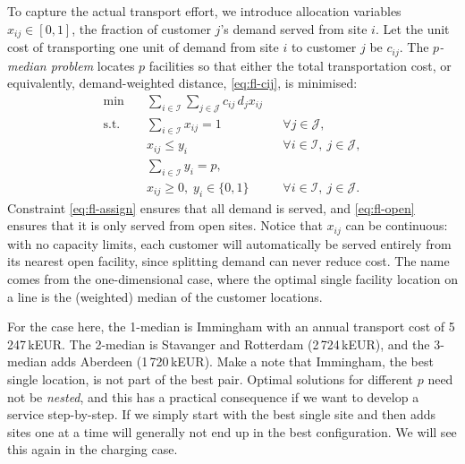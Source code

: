 To capture the actual transport effort, we introduce allocation variables $x_{ij}\in[0,1]$, the fraction of customer $j$'s demand served from site $i$. Let the unit cost of transporting one unit of demand from site $i$ to customer $j$ be $c_{ij}$. The \emph{$p$-median problem} locates $p$ facilities so that either the total transportation cost, or equivalently, demand-weighted distance, \eqref{eq:fl-cij}, is minimised:
\begin{align}
  \min\quad & \sum_{i\in\mathcal{I}}\sum_{j\in\mathcal{J}} c_{ij}\, d_{j} x_{ij} \label{eq:fl-pmed-obj}\\
  \text{s.t.}\quad & \sum_{i\in\mathcal{I}} x_{ij} = 1 && \forall j\in\mathcal{J}, \label{eq:fl-assign}\\
  & x_{ij} \le y_i && \forall i\in\mathcal{I},\ j\in\mathcal{J}, \label{eq:fl-open}\\
  & \sum_{i\in\mathcal{I}} y_i = p, \label{eq:fl-pmed-p}\\
  & x_{ij}\ge 0,\; y_i\in\{0,1\} && \forall i\in\mathcal{I},\ j\in\mathcal{J}. \nonumber
\end{align}
Constraint \eqref{eq:fl-assign} ensures that all demand is served, and \eqref{eq:fl-open} ensures that it is only served from open sites. Notice that $x_{ij}$ can be continuous: with no capacity limits, each customer will automatically be served entirely from its nearest open facility, since splitting demand can never reduce cost. The name comes from the one-dimensional case, where the optimal single facility location on a line is the (weighted) median of the customer locations.

For the case here, the 1-median is Immingham with an annual transport cost of 5\,247\,kEUR. The 2-median is Stavanger and Rotterdam (2\,724\,kEUR), and the 3-median adds Aberdeen (1\,720\,kEUR). Make a note that Immingham, the best single location, is not part of the best pair. Optimal solutions for different $p$ need not be \emph{nested}, and this has a practical consequence if we want to develop a service step-by-step. If we simply start with the best single site and then adds sites one at a time will generally not end up in the best configuration. We will see this again in the charging case.

